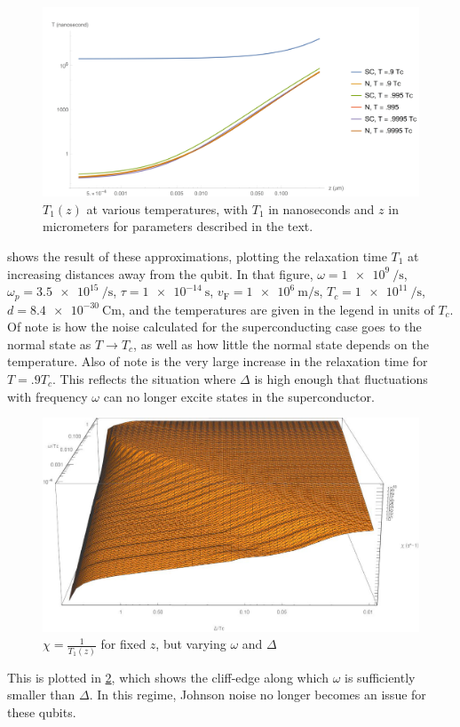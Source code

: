 \documentclass[%
 preprint,
 amsmath,amssymb,
 aps,
]{revtex4-2}
\newcommand{\vf}{v_{\mathrm{F}}}
\begin{document}
\begin{figure}[htp]
	\centering
	\includegraphics[width=\linewidth]{HighTempNam1}
	\caption{$T_1(z)$ at various temperatures, with $T_1$ in nanoseconds and $z$ in micrometers for parameters described in the text.} \label{fig:HighTempNam1}
\end{figure}
 shows the result of these approximations, plotting the relaxation time $T_1$ at increasing distances away from the qubit.
In that figure, $\omega = \SI{1e9}{\per\second}$, $\omega_p = \SI{3.5e15}{\per\second}$, $\tau = \SI{1e-14}{\second}$, $\vf = \SI{1e6}{\m\per\s}$, $T_c = \SI{1e11}{\per\s}$, $d = \SI{8.4e-30}{\coulomb\m}$, and the temperatures are given in the legend in units of $T_c$.
Of note is how the noise calculated for the superconducting case goes to the normal state as $T \rightarrow T_c$, as well as how little the normal state depends on the temperature.
Also of note is the very large increase in the relaxation time for $T = .9 T_c$.
This reflects the situation where $\Delta$ is high enough that fluctuations with frequency $\omega$ can no longer excite states in the superconductor.
\begin{figure}[htp]
	\centering
	\includegraphics[width=\linewidth]{namNoiseCliff}
	\caption{$\chi = \frac{1}{T_1(z)}$ for fixed $z$, but varying $\omega$ and $\Delta$} \label{fig:Cliff}
\end{figure}
This is plotted in \cref{fig:Cliff}, which shows the cliff-edge along which $\omega$ is sufficiently smaller than $\Delta$.
In this regime, Johnson noise no longer becomes an issue for these qubits.
\end{document}
